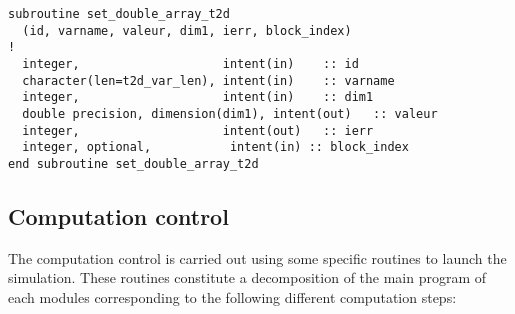\begin{lstlisting}
subroutine set_double_array_t2d
  (id, varname, valeur, dim1, ierr, block_index)
!
  integer,                    intent(in)    :: id
  character(len=t2d_var_len), intent(in)    :: varname
  integer,                    intent(in)    :: dim1
  double precision, dimension(dim1), intent(out)   :: valeur
  integer,                    intent(out)   :: ierr
  integer, optional,           intent(in) :: block_index
end subroutine set_double_array_t2d

\end{lstlisting}


\subsection{Computation control}
\label{subsec:exec}
The computation control is carried out using some specific routines to launch
the simulation. These routines constitute a decomposition of the main program
of each \telemacsystem modules corresponding to the following different
computation steps:

